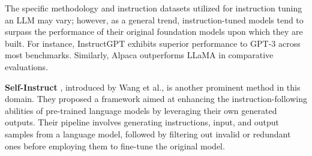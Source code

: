 The specific methodology and instruction datasets utilized for instruction tuning an LLM may vary; however, as a general trend, instruction-tuned models tend to surpass the performance of their original foundation models upon which they are built. For instance, InstructGPT \cite{ouyang2022training} exhibits superior performance to GPT-3 across most benchmarks. Similarly, Alpaca \cite{alpaca} outperforms LLaMA in comparative evaluations.

\textbf{Self-Instruct} \cite{wang2023selfinstruct}, introduced by Wang et al., is another prominent method in this domain. They proposed a framework aimed at enhancing the instruction-following abilities of pre-trained language models by leveraging their own generated outputs. Their pipeline involves generating instructions, input, and output samples from a language model, followed by filtering out invalid or redundant ones before employing them to fine-tune the original model.